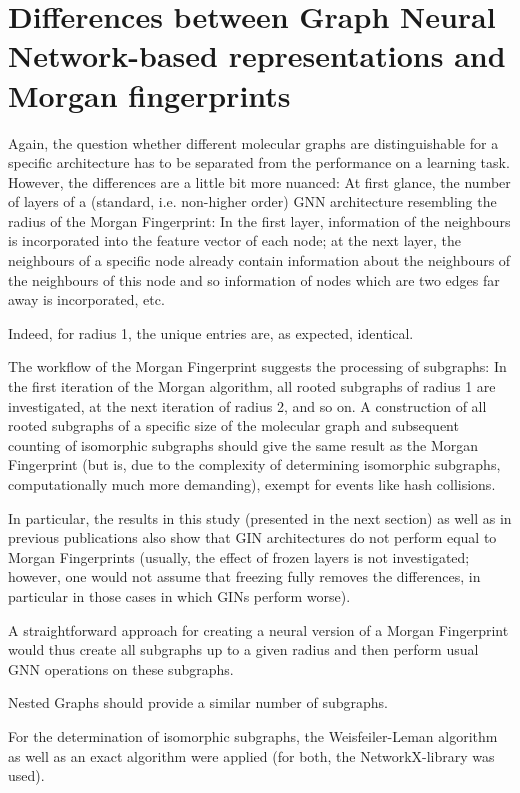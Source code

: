 \section{Differences between Graph Neural Network-based representations and Morgan fingerprints}

Again, the question whether different molecular graphs are distinguishable for a specific architecture has to be separated from the performance on a learning task.
However, the differences are a little bit more nuanced: 
At first glance, the number of layers of a (standard, i.e. non-higher order) GNN architecture resembling the radius of the Morgan Fingerprint: In the first layer, information of the neighbours is incorporated into the feature vector of each node; at the next layer, the neighbours of a specific node already contain information about the neighbours of the neighbours of this node and so information of nodes which are two edges far away is incorporated, etc.

Indeed, for radius 1, the unique entries are, as expected, identical.


The workflow of the Morgan Fingerprint suggests the processing of subgraphs: In the first iteration of the Morgan algorithm, all rooted subgraphs of radius 1 are investigated, at the next iteration of radius 2, and so on. 
A construction of all rooted subgraphs of a specific size of the molecular graph and subsequent counting of isomorphic subgraphs should give the same result as the Morgan Fingerprint (but is, due to the complexity of determining isomorphic subgraphs, computationally much more demanding), exempt for events like hash collisions.

In particular, the results in this study (presented in the next section) as well as in previous publications also show that GIN architectures do not perform equal to Morgan Fingerprints (usually, the effect of frozen layers is not investigated; however, one would not assume that freezing fully removes the differences, in particular in those cases in which GINs perform worse).

A straightforward approach for creating a neural version of a Morgan Fingerprint would thus create all subgraphs up to a given radius and then perform usual GNN operations on these subgraphs.

Nested Graphs should provide a similar number of subgraphs.


For the determination of isomorphic subgraphs, the Weisfeiler-Leman algorithm as well as an exact algorithm were applied (for both, the NetworkX-library was used).
